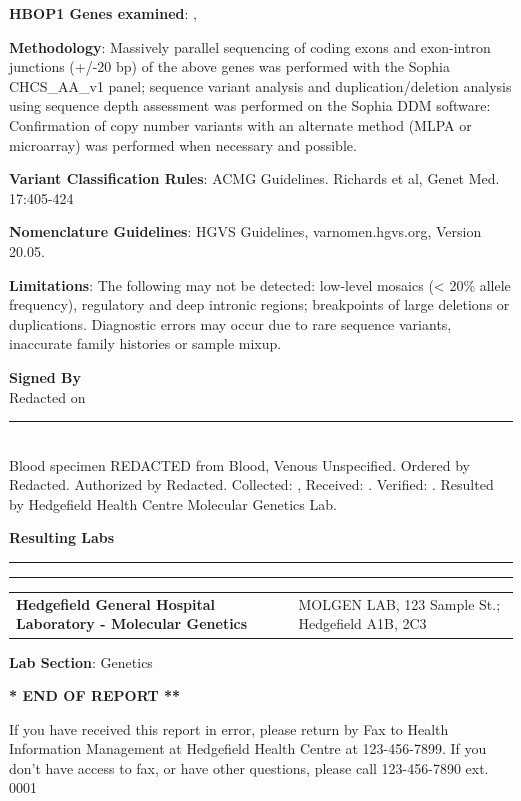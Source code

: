 \documentclass[10pt,letterpaper]{extarticle}
\newcommand{\doublerule}{\rule{\textwidth}{1pt}

\vspace{-2em}%
\rule{\textwidth}{1pt}}
\newcommand{\data}[1]{}
\newenvironment{dataiter}[1]{}{}
\begin{document}
{\bf HBOP1 Genes examined}: \begin{dataiter}{tested_genes}\data{gene_symbol}, \end{dataiter}

{\bf Methodology}: Massively parallel sequencing of coding exons and exon-intron junctions (+/-20 bp) of the above genes was performed with the Sophia CHCS\_AA\_v1 panel; sequence variant analysis and duplication/deletion analysis using sequence depth assessment was performed on the Sophia DDM software: Confirmation of copy number variants with an alternate method (MLPA or microarray) was performed when necessary and possible. 

{\bf Variant Classification Rules}: ACMG Guidelines. Richards et al, Genet Med. 17:405-424 

{\bf Nomenclature Guidelines}: HGVS Guidelines, varnomen.hgvs.org, Version 20.05. 

{\bf Limitations}: The following may not be detected: low-level mosaics (< 20\% allele frequency), regulatory and deep intronic regions; breakpoints of large deletions or duplications. Diagnostic errors may occur due to rare sequence variants, inaccurate family histories or sample mixup.

{\bf \large Signed By}\\
Redacted on \data{date_verified}

\vspace{2em}
\rule{\textwidth}{1pt}\\
{\small Blood specimen REDACTED from Blood, Venous Unspecified. Ordered by Redacted. Authorized by Redacted. Collected: \data{date_collected}, Received: \data{date_received}. Verified: \data{date_verified}. Resulted by Hedgefield Health Centre Molecular Genetics Lab.}

\vspace{2em}
{\bf \large Resulting Labs}\\
\doublerule

\begin{tabular}{p{5cm} p{15cm}}
\bf \small Hedgefield General Hospital Laboratory - Molecular Genetics & \small MOLGEN LAB, 123 Sample St.; Hedgefield A1B, 2C3
\end{tabular}

{\bf Lab Section}: Genetics

\begin{center}
\bf ** END OF REPORT **
\end{center}

\begin{center}
\scriptsize
If you have received this report in error, please return by Fax to Health Information Management at Hedgefield Health Centre at 123-456-7899. If you don't have access to fax, or have other questions, please call 123-456-7890 ext. 0001
\end{center}
\end{document}
